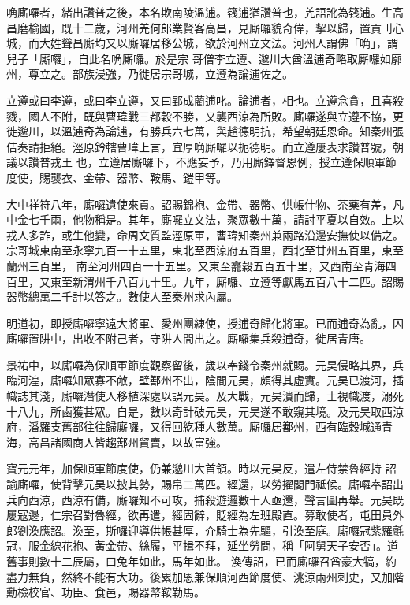 \begin{pinyinscope}
 唃廝囉者，緒出讚普之後，本名欺南陵溫逋。篯逋猶讚普也，羌語訛為篯逋。生高昌磨榆國，既十二歲，河州羌何郎業賢客高昌，見廝囉貌奇偉，挈以歸，置貢刂心城，而大姓聳昌廝均又以廝囉居移公城，欲於河州立文法。河州人謂佛「唃」，謂兒子「廝囉」，自此名唃廝囉。於是宗
 哥僧李立遵、邈川大酋溫逋奇略取廝囉如廓州，尊立之。部族浸強，乃徙居宗哥城，立遵為論逋佐之。



 立遵或曰李遵，或曰李立遵，又曰郢成藺逋叱。論逋者，相也。立遵念貪，且喜殺戮，國人不附，既與曹瑋戰三都穀不勝，又襲西涼為所敗。廝囉遂與立遵不協，更徙邈川，以溫逋奇為論逋，有勝兵六七萬，與趙德明抗，希望朝廷恩命。知秦州張佶奏請拒絕。涇原鈐轄曹瑋上言，宜厚唃廝囉以扼德明。而立遵屢表求讚普號，朝議以讚普戎王
 也，立遵居廝囉下，不應妄予，乃用廝鐸督恩例，授立遵保順軍節度使，賜襲衣、金帶、器幣、鞍馬、鎧甲等。



 大中祥符八年，廝囉遺使來貢。詔賜錦袍、金帶、器幣、供帳什物、茶藥有差，凡中金七千兩，他物稱是。其年，廝囉立文法，聚眾數十萬，請討平夏以自效。上以戎人多詐，或生他變，命周文質監涇原軍，曹瑋知秦州兼兩路沿邊安撫使以備之。宗哥城東南至永寧九百一十五里，東北至西涼府五百里，西北至甘州五百里，東至蘭州三百里，
 南至河州四百一十五里。又東至龕穀五百五十里，又西南至青海四百里，又東至新渭州千八百九十里。九年，廝囉、立遵等獻馬五百八十二匹。詔賜器幣總萬二千計以答之。數使人至秦州求內屬。



 明道初，即授廝囉寧遠大將軍、愛州團練使，授逋奇歸化將軍。已而逋奇為亂，囚廝囉置阱中，出收不附己者，守阱人間出之。廝囉集兵殺逋奇，徙居青唐。



 景祐中，以廝囉為保順軍節度觀察留後，歲以奉錢令秦州就賜。元昊侵略其界，兵
 臨河湟，廝囉知眾寡不敵，壁鄯州不出，陰間元昊，頗得其虛實。元昊已渡河，插幟誌其淺，廝囉潛使人移植深處以誤元昊。及大戰，元昊潰而歸，士視幟渡，溺死十八九，所鹵獲甚眾。自是，數以奇計破元昊，元昊遂不敢窺其境。及元昊取西涼府，潘羅支舊部往往歸廝囉，又得回紇種人數萬。廝囉居鄯州，西有臨穀城通青海，高昌諸國商人皆趨鄯州貿賣，以故富強。



 寶元元年，加保順軍節度使，仍兼邈川大首領。時以元昊反，遣左侍禁魯經持
 詔諭廝囉，使背擊元昊以披其勢，賜帛二萬匹。經還，以勞擢閣門祗候。廝囉奉詔出兵向西涼，西涼有備，廝囉知不可攻，捕殺遊邏數十人亟還，聲言圖再舉。元昊既屢寇邊，仁宗召對魯經，欲再遣，經固辭，貶經為左班殿直。募敢使者，屯田員外郎劉渙應詔。渙至，斯囉迎導供帳甚厚，介騎士為先驅，引渙至庭。廝囉冠紫羅氈冠，服金線花袍、黃金帶、絲履，平揖不拜，延坐勞問，稱「阿舅天子安否」。道舊事則數十二辰屬，曰兔年如此，馬年如此。
 渙傳詔，已而廝囉召酋豪大犒，約盡力無負，然終不能有大功。後累加恩兼保順河西節度使、洮涼兩州刺史，又加階勳檢校官、功臣、食邑，賜器幣鞍勒馬。




\end{pinyinscope}
